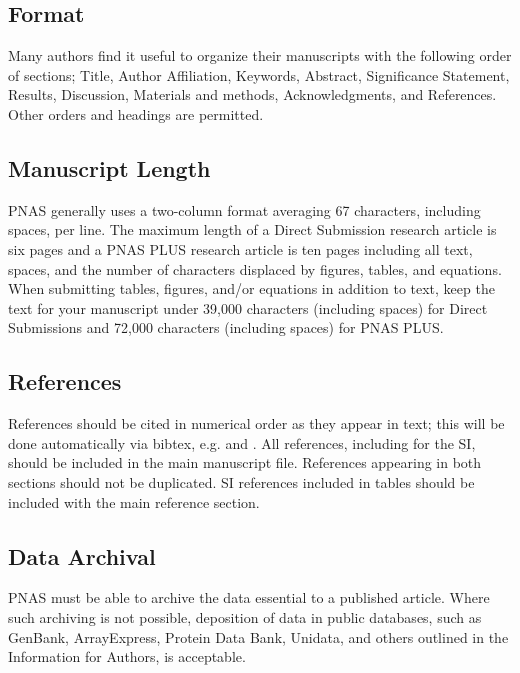 \documentclass[9pt,twocolumn,twoside,lineno]{pnas-new}
\begin{document}
\subsection*{Format}

Many authors find it useful to organize their manuscripts with the following order of sections;  Title, Author Affiliation, Keywords, Abstract, Significance Statement, Results, Discussion, Materials and methods, Acknowledgments, and References. Other orders and headings are permitted.

\subsection*{Manuscript Length}

PNAS generally uses a two-column format averaging 67 characters, including spaces, per line. The maximum length of a Direct Submission research article is six pages and a PNAS PLUS research article is ten pages including all text, spaces, and the number of characters displaced by figures, tables, and equations.  When submitting tables, figures, and/or equations in addition to text, keep the text for your manuscript under 39,000 characters (including spaces) for Direct Submissions and 72,000 characters (including spaces) for PNAS PLUS.

\subsection*{References}

References should be cited in numerical order as they appear in text; this will be done automatically via bibtex, e.g. \cite{belkin2002using} and \cite{berard1994embedding,coifman2005geometric}. All references, including for the SI, should be included in the main manuscript file. References appearing in both sections should not be duplicated.  SI references included in tables should be included with the main reference section. 

\subsection*{Data Archival}

PNAS must be able to archive the data essential to a published article. Where such archiving is not possible, deposition of data in public databases, such as GenBank, ArrayExpress, Protein Data Bank, Unidata, and others outlined in the Information for Authors, is acceptable.
\end{document}
